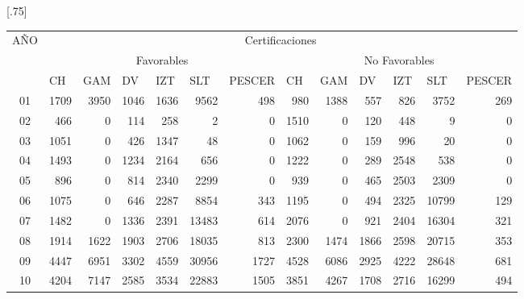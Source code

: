 \documentclass[12pt]{article}
\begin{document}
\begin{table}[ht]
\centering
\scalebox{0.75}[.75]{
\begin{tabular}{||c||rrrrrr||rrrrrr||}
\hline\hline
\multicolumn{1}{||c||}{\multirow{3}{*}{AÑO}} & \multicolumn{12}{c||}{Certificaciones}                                                                                                                                                                                                                                                                                               \\ \cline{2-13} 
\multicolumn{1}{||c||}{}& \multicolumn{6}{c||}{Favorables}                                                                                                                                  & \multicolumn{6}{c||}{No Favorables}                                                                                                                               \\ \cline{2-13} 
\multicolumn{1}{||c||}{}& \multicolumn{1}{l|}{CH} & \multicolumn{1}{l|}{GAM} & \multicolumn{1}{l|}{DV} & \multicolumn{1}{l|}{IZT} & \multicolumn{1}{l|}{SLT} & \multicolumn{1}{l||}{PESCER} & \multicolumn{1}{l|}{CH} & \multicolumn{1}{l|}{GAM} & \multicolumn{1}{l|}{DV} & \multicolumn{1}{l|}{IZT} & \multicolumn{1}{l|}{SLT} & \multicolumn{1}{l||}{PESCER} \\ \hline
01 &  1709 & 3950 & 1046 & 1636 & 9562 & 498&  980 & 1388 &  557 &  826 & 3752  &  269\\
  02 & 466 & 0 & 114 & 258 & 2 & 0& 1510 &    0  & 120 &  448 &    9  &    0\\
  03 & 1051 & 0 & 426 & 1347 & 48 & 0 & 1062 &    0  & 159 &  996 &   20  &    0\\
  04 & 1493 & 0 & 1234 & 2164 & 656 & 0& 1222 &    0  & 289 & 2548 &  538  &    0\\
  05 & 896 & 0 & 814 & 2340 & 2299 & 0&  939 &    0  & 465 & 2503 & 2309  &    0\\
  06 & 1075 & 0 & 646 & 2287 & 8854 & 343& 1195 &    0  & 494 & 2325 &10799  &  129\\
  07 & 1482 & 0 & 1336 & 2391 & 13483 & 614& 2076 &    0  & 921 & 2404 &16304  &  321\\
  08 & 1914 & 1622 & 1903 & 2706 & 18035 & 813& 2300 & 1474 & 1866 & 2598 &20715  &  353\\
  09 & 4447 & 6951&3302&  4559 &30956 &  1727& 4528 & 6086 & 2925 & 4222 &28648   &681\\
  10 & 4204 & 7147 & 2585 & 3534& 22883 &  1505& 3851 & 4267 & 1708 & 2716 &16299  &  494\\

\end{tabular}}
\end{table}
\end{document}
